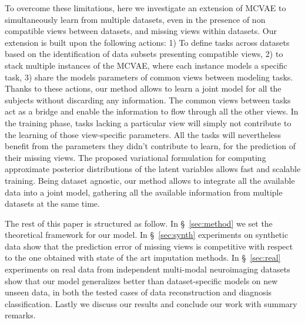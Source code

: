 To overcome these limitations, here we investigate an extension of MCVAE to simultaneously learn from multiple datasets, even in the presence of non compatible views between datasets, and missing views within datasets.
Our extension  is built upon the following actions:
1) To define tasks across datasets based on the identification of data subsets presenting compatible views,
2) to stack multiple instances of the MCVAE, where each instance models a specific task,
3) share the models parameters of common views between modeling tasks.
%
Thanks to these actions, our method allows to learn a joint model for all the subjects without discarding any information.
The common views between tasks act as a bridge and enable the information to flow through all the other views.
In the training phase, tasks lacking a particular view will simply not contribute to the learning of those view-specific parameters.
All the tasks will nevertheless benefit from the parameters they didn't contribute to learn, for the prediction of their missing views.
The proposed variational formulation for computing approximate posterior distributions of the latent variables allows fast and scalable training.
Being dataset agnostic, our method allows to integrate all the available data into a joint model, gathering  all the available information from multiple datasets at the same time.

The rest of this paper is structured as follow.
In \S~\ref{sec:method} we set the theoretical framework for our model.
In \S~\ref{sec:synth} experiments on synthetic data show that the prediction error of missing views is competitive with respect to the one obtained with state of the art imputation methods.
In \S~\ref{sec:real} experiments on real data from independent multi-modal neuroimaging datasets show that our model generalizes better than dataset-specific models on new unseen data, in both the tested cases of data reconstruction and diagnosis classification.
Lastly we discuss our results and conclude our work with summary remarks.

